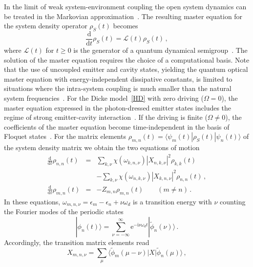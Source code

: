 \documentclass[aps,pra,twocolumn,showpacs,showkeys,10pt,nofootinbib]{revtex4-1}
\newcommand{\rme}{\mathrm e}
\newcommand{\rmi}{\mathrm i}
\newcommand{\rmd}{\mathrm d}
\begin{document}
In the limit of weak system-environment coupling the open system dynamics can be treated in the Markovian approximation~\cite{car99, bp02, wei12, aga13}.
The resulting master equation for the system density operator $\rho_S(t)$ becomes
\begin{equation}
  \frac{\rmd}{\rmd t} \rho_S(t) = \mathcal{L}(t) \rho_S(t) \,,
\end{equation}
where $\mathcal{L}(t)$ for $t\geq0$ is the generator of a quantum dynamical semigroup~\cite{lin76, gks76}.
The solution of the master equation requires the choice of a computational basis.
Note that the use of uncoupled emitter and cavity states, yielding the quantum optical master equation with energy-independent dissipative constants, is limited to situations where the intra-system coupling is much smaller than the natural system frequencies~\cite{car99,bgb11,paf15}.
For the Dicke model~\eqref{HD} with zero driving ($\Omega=0$), the master equation expressed in the photon-dressed emitter states includes the regime of strong emitter-cavity interaction~\cite{alz06, sb08, bgb11, rsh13, paf15}.
If the driving is finite ($\Omega\neq0$), the coefficients of the master equation become time-independent in the basis of Floquet states~\cite{bbgssw91, gh98, paf17}.
For the matrix elements $\rho_{m,n}(t)=\langle\psi_m(t)|\rho_S(t)|\psi_n(t)\rangle$ of the system density matrix we obtain the two equations of motion~\cite{paf17}
\begin{eqnarray}\label{master-nn}
  \frac{\rmd}{\rmd t} \rho_{n, n}(t) &=& \sum_{k, \nu} \chi(\omega_{k, n, \nu}) |X_{n, k, \nu}|^2 \rho_{k, k}(t) \nonumber\\
    && - \sum_{k, \nu} \chi(\omega_{n, k, \nu}) |X_{k, n, \nu}|^2 \rho_{n, n}(t) \,, \\\label{master-mn}
  \frac{\rmd}{\rmd t} \rho_{m, n}(t) &=& -Z_{m, n} \rho_{m, n}(t) \qquad (m \neq n) \,.
\end{eqnarray}
In these equations, $\omega_{m,n,\nu}=\epsilon_m-\epsilon_n+\nu\omega_d$ is a transition energy with $\nu$ counting the Fourier modes of the periodic states
\begin{equation}
  | \phi_n(t) \rangle = \sum_{\nu=-\infty}^\infty \rme^{-\rmi \nu \omega_d t} | \tilde{\phi}_n(\nu) \rangle \,.
\end{equation}
Accordingly, the transition matrix elements read
\begin{equation}
  X_{m, n, \nu} = \sum_\mu \langle \tilde{\phi}_m(\mu - \nu) | X | \tilde{\phi}_n(\mu) \rangle \,,
\end{equation}
\end{document}
